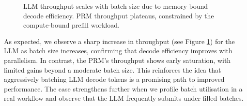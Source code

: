 \documentclass[11pt,twoside]{report}
\begin{document}
\begin{figure}[htbp]
\centering
{}
\hfill
{}
\caption{LLM throughput scales with batch size due to memory-bound decode efficiency. PRM throughput plateaus, constrained by the compute-bound prefill workload.}
\label{fig:prm_throughput_vs_llm_throughput}
\end{figure}

As expected, we observe a sharp increase in throughput (see Figure \ref{fig:prm_throughput_vs_llm_throughput}) for the LLM as batch size increases, confirming that decode efficiency improves with parallelism. 
In contrast, the PRM's throughput shows early saturation, with limited gains beyond a moderate batch size. 
This reinforces the idea that aggressively batching LLM decode tokens is a promising path to improved performance. 
The case strengthens further when we profile batch utilisation in a real workflow and observe that the LLM frequently submits under-filled batches.
\end{document}
